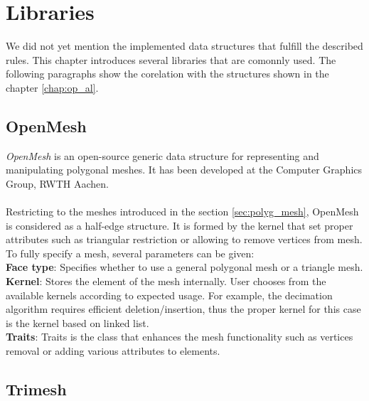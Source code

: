 \chapter{Libraries}

We did not yet mention the implemented data structures that fulfill the described rules.
This chapter introduces several libraries that are comonnly used. The following paragraphs show 
the corelation with the structures shown in the chapter \ref{chap:op_al}.

\section{OpenMesh}

\emph{OpenMesh}\cite{OMesh}\cite{Botsch2002} is an open-source generic data structure for representing
and manipulating polygonal meshes. It has been developed at the Computer Graphics Group, RWTH Aachen.
\\
\\
Restricting to the meshes introduced in the section \ref{sec:polyg_mesh},
OpenMesh is considered as a half-edge structure.
It is formed by the kernel that set proper attributes such as triangular restriction or allowing to remove
vertices from mesh.
\\
To fully specify a mesh, several parameters can be given:\\

\textbf{Face type}: Specifies whether to use a general polygonal mesh or a triangle mesh.\\

\textbf{Kernel}: Stores the element of the mesh internally. User chooses from the available
kernels according to expected usage. For example, the decimation algorithm requires
efficient deletion/insertion, thus the proper kernel for this case is the kernel based on
linked list.\\

\textbf{Traits}: Traits is the class that enhances the mesh functionality such as
vertices removal or adding various attributes to elements.

\section{Trimesh}

